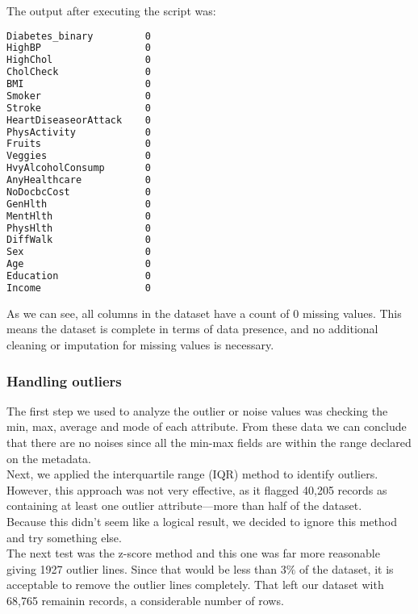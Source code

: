 

The output after executing the script was:

\begin{lstlisting}[language=bash]
Diabetes_binary         0
HighBP                  0
HighChol                0
CholCheck               0
BMI                     0
Smoker                  0
Stroke                  0
HeartDiseaseorAttack    0
PhysActivity            0
Fruits                  0
Veggies                 0
HvyAlcoholConsump       0
AnyHealthcare           0
NoDocbcCost             0
GenHlth                 0
MentHlth                0
PhysHlth                0
DiffWalk                0
Sex                     0
Age                     0
Education               0
Income                  0
\end{lstlisting}

As we can see, all columns in the dataset have a count of 0 missing values. This means the dataset is complete in terms of data presence, and no additional cleaning or imputation for missing values is necessary.

\subsubsection{Handling outliers}

The first step we used to analyze the outlier or noise values was checking the min, max, average and mode of each attribute. From these data we can conclude that there are no noises since all the min-max fields are within the range declared on the metadata.\\

\noindent Next, we applied the interquartile range (IQR) method to identify outliers. However, this approach was not very effective, as it flagged 40,205 records as containing at least one outlier attribute—more than half of the dataset.\\
Because this didn’t seem like a logical result, we decided to ignore this method and try something else.\\

\noindent The next test was the z-score method and this one was far more reasonable giving 1927 outlier lines. Since that would be less than 3$\%$ of the dataset, it is acceptable to remove the outlier lines completely. That left our dataset with 68,765 remainin records, a considerable number of rows.\\

